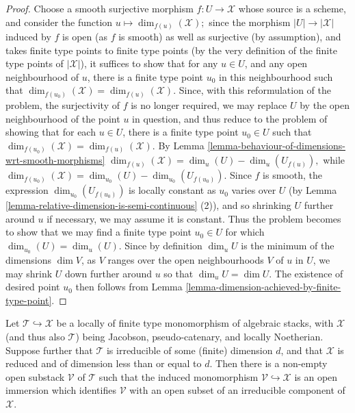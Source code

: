 \begin{proof}
Choose a smooth surjective
morphism  $f:U \to \mathcal{X}$ whose source is a scheme, and consider the
function $u \mapsto \dim_{f(u)}(\mathcal{X});$
since the morphism $|U| \to |\mathcal{X}|$ induced by $f$ is open (as $f$
is smooth) as well as  surjective (by assumption),
and takes finite type points to finite type points (by the very definition
of the finite type points of $|\mathcal{X}|$),
it suffices to show that for any $u \in U$, and any open neighbourhood of $u$,
there is a finite type point $u_0$ in this neighbourhood such that
$\dim_{f(u_0)}(\mathcal{X}) = \dim_{f(u)}(\mathcal{X}).$
Since, with this reformulation
of the problem,  the surjectivity of $f$ is no longer required,
we may replace $U$ by the open neighbourhood of the point $u$ in question,
and thus reduce to the problem of showing that for each $u \in U$,
there is a finite type point $u_0 \in U$ such that
$\dim_{f(u_0)}(\mathcal{X}) = \dim_{f(u)}(\mathcal{X}).$
By Lemma \ref{lemma-behaviour-of-dimensions-wrt-smooth-morphisms}
$\dim_{f(u)}(\mathcal{X}) = \dim_u(U) - \dim_u(U_{f(u)}),$
while
$\dim_{f(u_0)}(\mathcal{X}) = \dim_{u_0}(U) - \dim_{u_0}(U_{f(u_0)}).$
Since $f$ is smooth, the expression $\dim_{u_0}(U_{f(u_0)})$ is locally
constant as $u_0$ varies over $U$ (by
Lemma \ref{lemma-relative-dimension-is-semi-continuous} (2)),
and so shrinking $U$ further around
$u$ if necessary, we may assume it is constant.  Thus the problem
becomes to show that we may find a finite type point $u_0 \in U$
for which $\dim_{u_0}(U) = \dim_u(U)$.
Since by definition $\dim_u U$ is the minimum of the dimensions
$\dim V$, as $V$ ranges over the open neighbourhoods $V$ of $u$
in $U$, we may shrink $U$ down further around $u$ so that
$\dim_u U = \dim U$.
The existence of desired point $u_0$ then follows from
Lemma \ref{lemma-dimension-achieved-by-finite-type-point}.
\end{proof}

\begin{lemma}
\label{lemma-monomorphing-a-component-in-of-the-right-dimension}
Let $\mathcal{T} \hookrightarrow \mathcal{X}$ be a locally
of finite type monomorphism of algebraic stacks,
with $\mathcal{X}$ (and thus also $\mathcal{T}$)
being Jacobson, pseudo-catenary, and locally Noetherian.
Suppose further that $\mathcal{T}$ is irreducible
of some (finite) dimension $d$, and that $\mathcal{X}$ is reduced
and of dimension less
than or equal to $d$.
Then there is a non-empty open substack $\mathcal{V}$ of $\mathcal{T}$ such
that the induced
monomorphism $\mathcal{V} \hookrightarrow \mathcal{X}$ is an open immersion
which identifies
$\mathcal{V}$ with an open subset of an irreducible component of $\mathcal{X}$.
\end{lemma}

